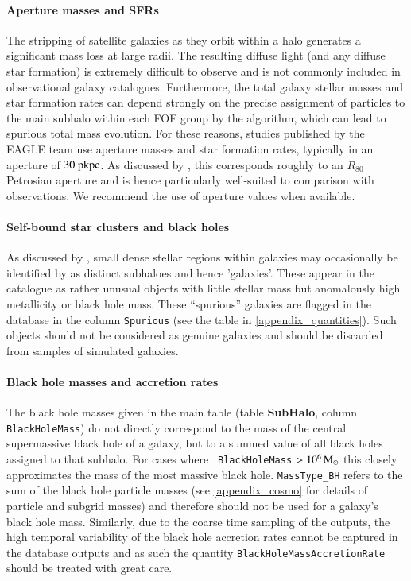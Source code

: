 \paragraph{\bf Aperture masses and SFRs} 
The stripping of satellite galaxies as they orbit within a halo generates a
significant mass loss at large radii. The resulting diffuse light (and any
diffuse star formation) is extremely difficult to observe and is not commonly
included in observational galaxy catalogues.  Furthermore, the total galaxy
stellar masses and star formation rates can depend strongly on the precise
assignment of particles to the main subhalo within each FOF group by the
\subfind algorithm, which can lead to spurious total mass evolution.  For these
reasons, studies published by the EAGLE team use aperture masses and star
formation rates, typically in an aperture of $30~\rm{pkpc}$. As discussed by
\cite{Schaye2015}, this corresponds roughly to an $R_{80}$ Petrosian aperture
and is hence particularly well-suited to comparison with observations. We
recommend the use of aperture values when available.

\paragraph{\bf Self-bound star clusters and black holes}
As discussed by \cite{Schaye2015}, small dense stellar regions within galaxies
may occasionally be identified by \subfind as distinct subhaloes and hence
'galaxies'. These appear in the catalogue as rather unusual objects with little
stellar mass but anomalously high metallicity or black hole mass. These
``spurious'' galaxies are flagged in the database in the column {\tt Spurious}
(see the table in \ref{appendix_quantities}). Such objects should not be
considered as genuine galaxies and should be discarded from samples of simulated
galaxies.

\paragraph{\bf Black hole masses and accretion rates}
The black hole masses given in the main table (table {\bf SubHalo}, column {\tt
  BlackHoleMass}) do not directly correspond to the mass of the central
supermassive black hole of a galaxy, but to a summed value of all black holes
assigned to that subhalo. For cases where {\tt
  BlackHoleMass} $> 10^6\, \mathrm{M}_\odot$ this closely approximates the mass of
the most massive black hole. {\tt MassType\_BH} refers to the sum of the black
hole particle masses (see \ref{appendix_cosmo} for details of particle and
subgrid masses) and therefore should not be used for a galaxy's black hole
mass. Similarly, due to the coarse time sampling of the outputs, the high
temporal variability of the black hole accretion rates cannot be captured in the
database outputs and as such the quantity {\tt BlackHoleMassAccretionRate} should be
treated with great care.

